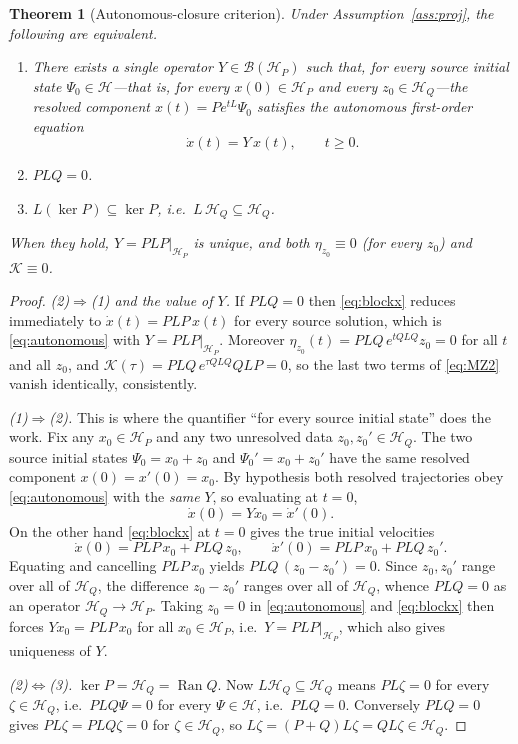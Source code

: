 \documentclass[11pt,reqno]{amsart}
\numberwithin{equation}{section}
\theoremstyle{plain}
\newtheorem{theorem}{Theorem}[section]
\theoremstyle{definition}
\theoremstyle{remark}
\newcommand{\HP}{\mathcal{H}_{P}}
\newcommand{\HQ}{\mathcal{H}_{Q}}
\newcommand{\Ran}{\operatorname{Ran}}
\newcommand{\Kmem}{\mathcal{K}}
\begin{document}
\begin{theorem}[Autonomous-closure criterion]
\label{thm:closure}
Under Assumption~\ref{ass:proj}, the following are equivalent.
\begin{enumerate}
\item There exists a single operator $Y\in\mathcal{B}(\HP)$ such that, \emph{for every}
source initial state $\Psi_{0}\in\mathcal{H}$---that is, for every $x(0)\in\HP$ and every
$z_{0}\in\HQ$---the resolved component $x(t)=Pe^{tL}\Psi_{0}$ satisfies the autonomous
first-order equation
\begin{equation}
\label{eq:autonomous}
\dot x(t)=Y\,x(t),\qquad t\ge0 .
\end{equation}
\item $PLQ=0$.
\item $L(\ker P)\subseteq\ker P$, i.e.\ $L\,\HQ\subseteq\HQ$.
\end{enumerate}
When they hold, $Y=PLP|_{\HP}$ is unique, and both $\eta_{z_{0}}\equiv0$ (for every $z_{0}$)
and $\Kmem\equiv0$.
\end{theorem}

\begin{proof}
\emph{(2)$\Rightarrow$(1) and the value of $Y$.} If $PLQ=0$ then \eqref{eq:blockx} reduces
immediately to $\dot x(t)=PLP\,x(t)$ for every source solution, which is \eqref{eq:autonomous}
with $Y=PLP|_{\HP}$. Moreover $\eta_{z_{0}}(t)=PLQ\,e^{tQLQ}z_{0}=0$ for all $t$ and all
$z_{0}$, and $\Kmem(\tau)=PLQ\,e^{\tau QLQ}QLP=0$, so the last two terms of \eqref{eq:MZ2}
vanish identically, consistently.

\emph{(1)$\Rightarrow$(2).} This is where the quantifier ``for every source initial state''
does the work. Fix any $x_{0}\in\HP$ and any two unresolved data $z_{0},z_{0}'\in\HQ$. The two
source initial states $\Psi_{0}=x_{0}+z_{0}$ and $\Psi_{0}'=x_{0}+z_{0}'$ have the same
resolved component $x(0)=x'(0)=x_{0}$. By hypothesis both resolved trajectories obey
\eqref{eq:autonomous} with the \emph{same} $Y$, so evaluating at $t=0$,
\[
\dot x(0)=Y x_{0}=\dot x'(0).
\]
On the other hand \eqref{eq:blockx} at $t=0$ gives the true initial velocities
\[
\dot x(0)=PLP\,x_{0}+PLQ\,z_{0},
\qquad
\dot x'(0)=PLP\,x_{0}+PLQ\,z_{0}' .
\]
Equating and cancelling $PLP\,x_{0}$ yields $PLQ\,(z_{0}-z_{0}')=0$. Since $z_{0},z_{0}'$
range over all of $\HQ$, the difference $z_{0}-z_{0}'$ ranges over all of $\HQ$, whence
$PLQ=0$ as an operator $\HQ\to\HP$. Taking $z_{0}=0$ in \eqref{eq:autonomous} and
\eqref{eq:blockx} then forces $Yx_{0}=PLP\,x_{0}$ for all $x_{0}\in\HP$, i.e.\
$Y=PLP|_{\HP}$, which also gives uniqueness of $Y$.

\emph{(2)$\Leftrightarrow$(3).} $\ker P=\HQ=\Ran Q$. Now $L\HQ\subseteq\HQ$ means
$PL\zeta=0$ for every $\zeta\in\HQ$, i.e.\ $PLQ\Psi=0$ for every $\Psi\in\mathcal{H}$, i.e.\
$PLQ=0$. Conversely $PLQ=0$ gives $PL\zeta=PLQ\zeta=0$ for $\zeta\in\HQ$, so
$L\zeta=(P+Q)L\zeta=QL\zeta\in\HQ$.
\end{proof}
\end{document}
